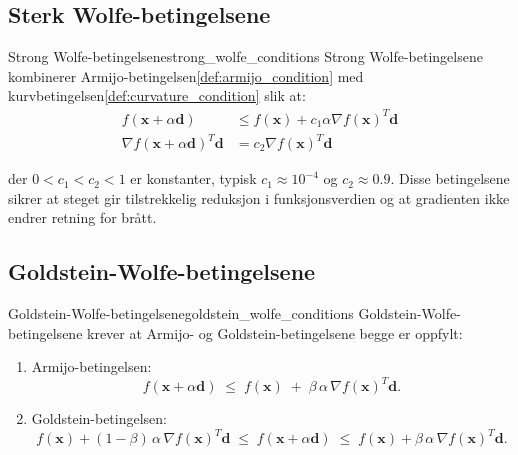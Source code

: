 \subsection{Sterk Wolfe-betingelsene}
\begin{definition}{Strong Wolfe-betingelsene}{strong_wolfe_conditions}
	Strong Wolfe-betingelsene kombinerer Armijo-betingelsen\ref{def:armijo_condition} med kurvbetingelsen\ref{def:curvature_condition} slik at:
	\begin{align*}
		f(\symbf{x} + \alpha \symbf{d})                    & \leq f(\symbf{x}) + c_1 \alpha \nabla f(\symbf{x})^T \symbf{d} \\
		\nabla f(\symbf{x} + \alpha \symbf{d})^T \symbf{d} & = c_2 \nabla f(\symbf{x})^T \symbf{d}
	\end{align*}

	der \(0 < c_1 < c_2 < 1\) er konstanter, typisk \(c_1 \approx 10^{-4}\) og \(c_2 \approx 0.9\).
	\medskip
	Disse betingelsene sikrer at steget gir tilstrekkelig reduksjon i funksjonsverdien og at gradienten ikke endrer retning for brått.
\end{definition}

\subsection{Goldstein-Wolfe-betingelsene}
\begin{definition}{Goldstein-Wolfe-betingelsene}{goldstein_wolfe_conditions}
	Goldstein-Wolfe-betingelsene krever at Armijo- og Goldstein-betingelsene begge er oppfylt:
	\begin{enumerate}
		\item Armijo-betingelsen:
		      \[
			      f(\symbf{x} + \alpha \symbf{d})
			      \;\le\;
			      f(\symbf{x})
			      \;+\;
			      \beta\,\alpha\,\nabla f(\symbf{x})^T \symbf{d}.
		      \]
		\item Goldstein-betingelsen:
		      \[
			      f(\symbf{x}) + (1-\beta)\,\alpha\,\nabla f(\symbf{x})^T \symbf{d}
			      \;\le\;
			      f(\symbf{x} + \alpha \symbf{d})
			      \;\le\;
			      f(\symbf{x}) + \beta\,\alpha\,\nabla f(\symbf{x})^T \symbf{d}.
		      \]
	\end{enumerate}
\end{definition}

